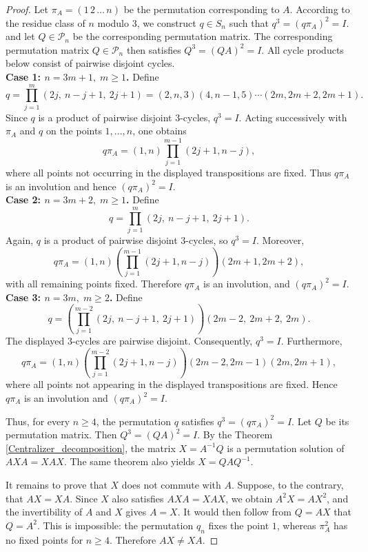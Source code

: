 \documentclass{article}
\theoremstyle{definition}\newtheorem{example}{Example}[section]
\def\P{{\mathcal{P}}}
\begin{document}
	\begin{proof}
		Let $\pi_A=(1\,2\,\dots\,n)$ be the permutation corresponding to $A$. According to the residue class of $n$ modulo $3$, we construct $q\in S_n$ such that $q^3=(q\pi_A)^2=I$. and let $Q\in\P_n$ be the corresponding permutation matrix. The corresponding permutation matrix $Q\in\P_n$ then satisfies $Q^3=(QA)^2=I.$ All cycle products below consist of pairwise disjoint cycles.\\
		
		\noindent\textbf{Case 1: $n=3m+1,\;m\geq 1$.} Define 
		$$q=\prod_{j=1}^{m}(2j,\ n-j+1,\ 2j+1)=(2,n,3)(4,n-1,5)\cdots(2m,2m+2,2m+1).$$ 
		Since $q$ is a product of pairwise disjoint $3$-cycles, $q^3=I$. Acting successively with $\pi_A$ and $q$ on the points $1,...,n$, one obtains 
		$$q\pi_A=(1,n)\prod_{j=1}^{m-1}(2j+1,n-j),$$ 
		where all points not occurring in the displayed transpositions are fixed. Thus $q\pi_A$ is an involution and hence $(q\pi_A)^2=I.$\\
		
		\noindent \textbf{Case 2: $n=3m+2,\;m\geq 1$.} Define 
		$$q=\prod_{j=1}^{m}(2j,\ n-j+1,\ 2j+1).$$
		Again, $q$ is a product of pairwise disjoint $3$-cycles, so $q^3=I.$ Moreover, 
		$$q\pi_A = (1,n) \left( \prod_{j=1}^{m-1}(2j+1,n-j) \right) (2m+1,2m+2),$$ 
		with all remaining points fixed. Therefore $q\pi_A$ is an involution, and $ (q\pi_A)^2=I.$\\
		
		\noindent \textbf{Case 3: $n=3m,\;m\geq 2$.} Define 
		$$q= \left( \prod_{j=1}^{m-2} (2j,\ n-j+1,\ 2j+1) \right) (2m-2,\ 2m+2,\ 2m).$$ 
		The displayed $3$-cycles are pairwise disjoint. Consequently, $q^3=I.$ Furthermore, 
		$$q\pi_A = (1,n) \left( \prod_{j=1}^{m-2}(2j+1,n-j) \right) (2m-2,2m-1)(2m,2m+1),$$ 
		where all points not appearing in the displayed transpositions are fixed. Hence $q\pi_A$ is an involution and $(q\pi_A)^2=I.$ 
		
		Thus, for every $n\geq 4$, the permutation $q$ satisfies $q^3=(q\pi_A)^2=I.$ Let $Q$ be its permutation matrix. Then $Q^3=(QA)^2=I.$ By the Theorem \ref{Centralizer_decomposition}, the matrix $X=A^{-1}Q$ is a permutation solution of $AXA=XAX.$ The same theorem also yields $X=QAQ^{-1}.$
		
		It remains to prove that $X$ does not commute with $A$. Suppose, to the contrary, that $AX=XA.$ Since $X$ also satisfies $AXA=XAX$, we obtain $A^2X=AX^2$, and the invertibility of $A$ and $X$ gives $A=X.$ It would then follow from $Q=AX$ that $Q=A^2.$ This is impossible: the permutation $q_n$ fixes the point $1$, whereas $\pi_A^2$ has no fixed points for $n\geq 4$. Therefore $AX\neq XA.$
		

\end{proof}
\end{document}
